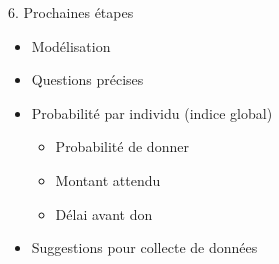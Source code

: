 \documentclass[12pt,ignorenonframetext,]{beamer}
\providecommand{\tightlist}{%
  \setlength{\itemsep}{0pt}\setlength{\parskip}{0pt}}
\begin{document}
\begin{frame}{6. Prochaines étapes}
\protect\hypertarget{prochaines-uxe9tapes}{}
\begin{itemize}
\item
  Modélisation
\item
  Questions précises
\item
  Probabilité par individu (indice global)

  \begin{itemize}
  \tightlist
  \item
    Probabilité de donner
  \item
    Montant attendu
  \item
    Délai avant don
  \end{itemize}
\item
  Suggestions pour collecte de données
\end{itemize}
\end{frame}





\end{document}
